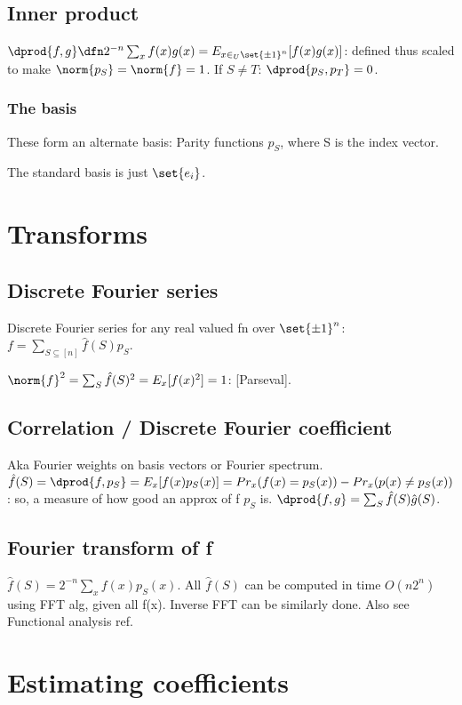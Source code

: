 \documentclass[oneside, article]{memoir}
\begin{document}
\subsection{Inner product}
$\dprod{f,g} \dfn 2^{-n} \sum_{x} f(x)g(x) = E_{x \in_{U} \set{\pm 1}^{n}}[f(x)g(x)]$: defined thus scaled to make $\norm{p_{S}} = \norm{f} = 1$. If $S \neq T$: $\dprod{p_{S}, p_{T}} = 0$.

\subsubsection{The basis}
These form an alternate basis: Parity functions $p_{S}$, where S is the index vector.

The standard basis is just $\set{e_i}$.

\section{Transforms}
\subsection{Discrete Fourier series}
Discrete Fourier series for any real valued fn over $\set{\pm 1}^{n}$: $f = \sum_{S\subseteq [n]} \hat{f}(S)p_{S}$.

$\norm{f}^{2} = \sum_{S} \hat{f}(S)^{2} = E_{x}[f(x)^{2}] = 1$: [Parseval].

\subsection{Correlation / Discrete Fourier coefficient}
Aka Fourier weights on basis vectors or Fourier spectrum. $\hat{f}(S) = \dprod{f, p_{S}} = E_{x}[f(x)p_{S}(x)]= Pr_{x}(f(x) = p_S(x)) - Pr_{x}(p(x) \neq p_S(x))$: so, a measure of how good an approx of f $p_S$ is. $\dprod{f,g} = \sum_{S} \hat{f}(S) \hat{g}(S)$.

\subsection{Fourier transform of f}
$\hat{f}(S) = 2^{-n} \sum_{x} f(x)p_{S}(x)$. All $\hat{f}(S)$ can be computed in time $O(n2^{n})$ using FFT alg, given all f(x). \why Inverse FFT can be similarly done. Also see Functional analysis ref.

\section{Estimating coefficients}
\end{document}
